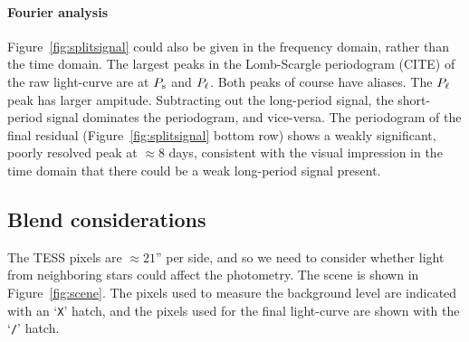 \documentclass[12pt,twocolumn,tighten]{aastex62}
\begin{document}
% 
% 
% 


\paragraph{Fourier analysis}
Figure~\ref{fig:splitsignal} could also be given in the frequency
domain, rather than the time domain.
The largest peaks in 
the Lomb-Scargle periodogram (CITE) of the raw light-curve are
at $P_{\rm s}$ and $P_{\rm \ell}$.
Both peaks of course have aliases.
The $P_{\rm \ell}$ peak has larger ampitude.
Subtracting out the long-period signal, the short-period signal
dominates the periodogram, and vice-versa.
The periodogram of the final residual (Figure~\ref{fig:splitsignal}
bottom row) shows a weakly significant, poorly resolved peak at
$\approx$8 days, consistent with the visual impression in the time
domain that there could be a weak long-period signal present.


\subsection{Blend considerations}
\label{subsec:blend}

The TESS pixels are $\approx21$'' per side, and so we need to consider
whether light from neighboring stars could affect the photometry.  The
scene is shown in Figure~\ref{fig:scene}.  
The pixels used to
measure the background level are indicated with an `\texttt{X}' hatch,
and the pixels used for the final light-curve are shown with the
`\texttt{/}' hatch.
\end{document}
